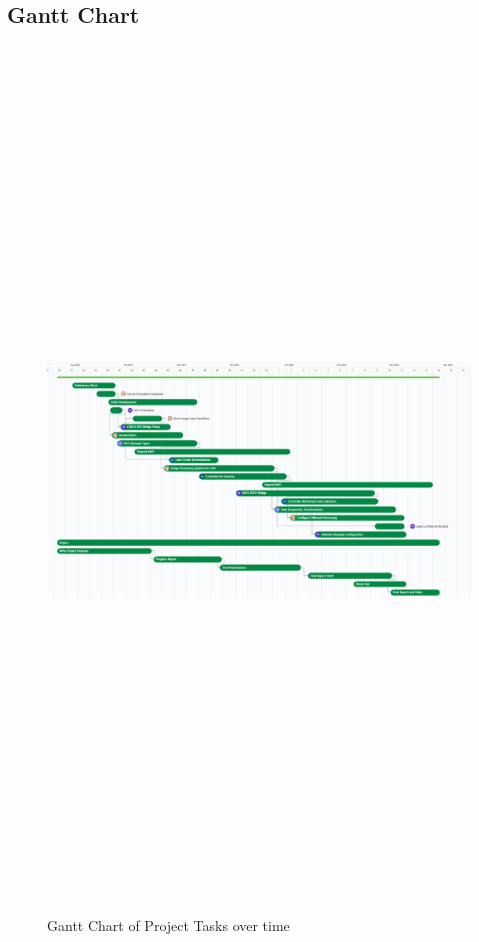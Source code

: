 \documentclass[titlepage, draft]{article}
\begin{document}
\subsection{Gantt Chart}

\begin{figure}[H]
	\centering
	\includegraphics[angle=90,height=9in]{gantt}
	\caption{Gantt Chart of Project Tasks over time}
	\label{fig:gantt_chart}
\end{figure}
\end{document}
